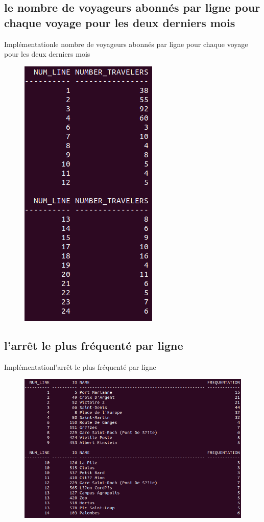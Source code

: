 \documentclass[usenames,dvipsnames]{beamer}
\begin{document}
\subsection{le nombre de voyageurs abonnés par ligne pour chaque voyage pour les deux derniers mois}
\begin{frame}{Implémentation}{le nombre de voyageurs abonnés par ligne pour chaque voyage pour les deux derniers mois}
\begin{figure}[!ht]
  \centering
  \includegraphics[scale=0.5]{images/requetes_analytiques/requ2.png}
\end{figure}
\end{frame}

\subsection{l'arrêt le plus fréquenté par ligne}
\begin{frame}{Implémentation}{l'arrêt le plus fréquenté par ligne}
\begin{figure}[!ht]
  \centering
  \includegraphics[scale=0.5]{images/requetes_analytiques/requ3.png}
\end{figure}
\end{frame}
\end{document}
